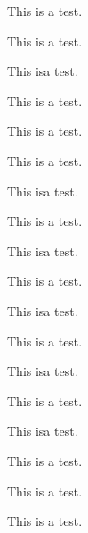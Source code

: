 \documentclass[twocolumn]{jarticle}
\begin{document}
This is \linebreak[4]a test.\par  %
This is \linebreak[4] a test.\par %
This is\linebreak[0] a test.\par  %
This is \linebreak[0]a test.\par  %
This is \linebreak[0] a test.\par %
This is a test.\par               %
This is\hskip20pt\linebreak a test.\par     %
This is \hskip20pt\linebreak a test.\par    %
This is\hskip20pt\linebreak[4]a test.\par   %
This is \hskip20pt\linebreak[4]a test.\par  %
This is\hskip20pt\linebreak[4] a test.\par  %
This is \hskip20pt\linebreak[4] a test.\par %
This is\hskip20pt\linebreak[0]a test.\par   %
This is \hskip20pt\linebreak[0]a test.\par  %
This is\hskip20pt\linebreak[0] a test.\par  %
This is \hskip20pt\linebreak[0] a test.\par %
This is\hskip20pt a test.\par               %
This is \hskip20pt a test.\par              %
\end{document}
